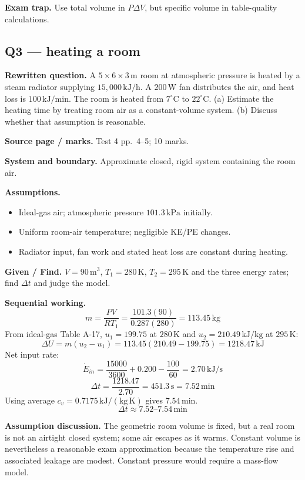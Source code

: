 \textbf{Exam trap.} Use total volume in $P\Delta V$, but specific volume in table-quality calculations.

\subsection*{Q3 --- heating a room}
\textbf{Rewritten question.} A $5\times6\times3\,\mathrm{m}$ room at atmospheric pressure is heated by a steam radiator supplying $15{,}000\,\mathrm{kJ/h}$. A $200\,\mathrm{W}$ fan distributes the air, and heat loss is $100\,\mathrm{kJ/min}$. The room is heated from $7^\circ\mathrm{C}$ to $22^\circ\mathrm{C}$. (a) Estimate the heating time by treating room air as a constant-volume system. (b) Discuss whether that assumption is reasonable.

\textbf{Source page / marks.} Test 4 pp.~4--5; 10 marks.

\textbf{System and boundary.} Approximate closed, rigid system containing the room air.

\textbf{Assumptions.}
\begin{itemize}
  \item Ideal-gas air; atmospheric pressure $101.3\,\mathrm{kPa}$ initially.
  \item Uniform room-air temperature; negligible KE/PE changes.
  \item Radiator input, fan work and stated heat loss are constant during heating.
\end{itemize}

\textbf{Given / Find.} $V=90\,\mathrm{m^3}$, $T_1=280\,\mathrm{K}$, $T_2=295\,\mathrm{K}$ and the three energy rates; find $\Delta t$ and judge the model.


\textbf{Sequential working.}
\[
m=\frac{PV}{RT_1}=\frac{101.3(90)}{0.287(280)}=113.45\,\mathrm{kg}
\]
From ideal-gas Table A-17, $u_1=199.75$ at $280\,\mathrm{K}$ and $u_2=210.49\,\mathrm{kJ/kg}$ at $295\,\mathrm{K}$:
\[
\Delta U=m(u_2-u_1)=113.45(210.49-199.75)=1218.47\,\mathrm{kJ}
\]
Net input rate:
\[
\dot E_{in}=\frac{15000}{3600}+0.200-\frac{100}{60}=2.70\,\mathrm{kJ/s}
\]
\[
\Delta t=\frac{1218.47}{2.70}=451.3\,\mathrm{s}=7.52\,\mathrm{min}
\]
Using average $c_v=0.7175\,\mathrm{kJ/(kg\,K)}$ gives $7.54\,\mathrm{min}$.
\[
\boxed{\Delta t\approx7.52\text{--}7.54\,\mathrm{min}}
\]

\textbf{Assumption discussion.} The geometric room volume is fixed, but a real room is not an airtight closed system; some air escapes as it warms. Constant volume is nevertheless a reasonable exam approximation because the temperature rise and associated leakage are modest. Constant pressure would require a mass-flow model.

